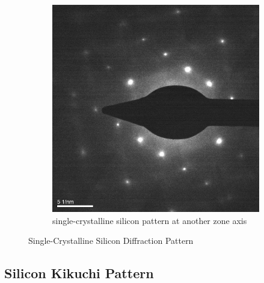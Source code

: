 \documentclass[12pt,a4paper]{article}
\begin{document}
\begin{figure}[htbp]
\begin{subfigure}[b]{0.45\textwidth}
    \includegraphics[width=\textwidth]{data/Image4 Si_Diff_Zone2.png}
    \caption{single-crystalline silicon pattern at another zone axis}
    \label{fig:si2}
  \end{subfigure}
  \caption{Single-Crystalline Silicon Diffraction Pattern}
  \label{fig:Silicon}
\end{figure}


\subsection{Silicon Kikuchi Pattern} %
\label{sub:kikuchi_pattern}

\lipsum[20]
\end{document}
